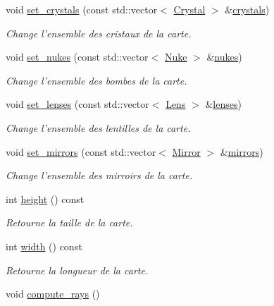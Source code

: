 \begin{DoxyCompactItemize}
void \hyperlink{classLevel_ab1c04c615e4cd6ab36269c8c4a877d06}{set\+\_\+crystals} (const std\+::vector$<$ \hyperlink{classCrystal}{Crystal} $>$ \&\hyperlink{classLevel_a5371b5d3d021f9b9cbb3ba4701746ae2}{crystals})
\begin{DoxyCompactList}\small\item\em Change l'ensemble des cristaux de la carte. \end{DoxyCompactList}\item 
void \hyperlink{classLevel_a83067f34c93b767859ee94c3d1921a42}{set\+\_\+nukes} (const std\+::vector$<$ \hyperlink{classNuke}{Nuke} $>$ \&\hyperlink{classLevel_acd20c7d517d45796dd33bf9846469cd5}{nukes})
\begin{DoxyCompactList}\small\item\em Change l'ensemble des bombes de la carte. \end{DoxyCompactList}\item 
void \hyperlink{classLevel_a94b1dd81fc9d646b5ccd3b52d7702aa4}{set\+\_\+lenses} (const std\+::vector$<$ \hyperlink{classLens}{Lens} $>$ \&\hyperlink{classLevel_aca6b1af0d4c00c50922bcc1af73f102b}{lenses})
\begin{DoxyCompactList}\small\item\em Change l'ensemble des lentilles de la carte. \end{DoxyCompactList}\item 
void \hyperlink{classLevel_a1c18d7c9c016439a995d6d21a03a9470}{set\+\_\+mirrors} (const std\+::vector$<$ \hyperlink{classMirror}{Mirror} $>$ \&\hyperlink{classLevel_aa135dbdea931709337ffcb2fd1ac6b68}{mirrors})
\begin{DoxyCompactList}\small\item\em Change l'ensemble des mirroirs de la carte. \end{DoxyCompactList}\item 
int \hyperlink{classLevel_ac45aad2aa6f8d83f3a619a70f6543ecc}{height} () const 
\begin{DoxyCompactList}\small\item\em Retourne la taille de la carte. \end{DoxyCompactList}\item 
int \hyperlink{classLevel_ad24f669bee981e8d8e688f5d7fad1cc2}{width} () const 
\begin{DoxyCompactList}\small\item\em Retourne la longueur de la carte. \end{DoxyCompactList}\item 
void \hyperlink{classLevel_a731133a250f6ee38179716b3c7492636}{compute\+\_\+rays} ()

\end{DoxyCompactItemize}

